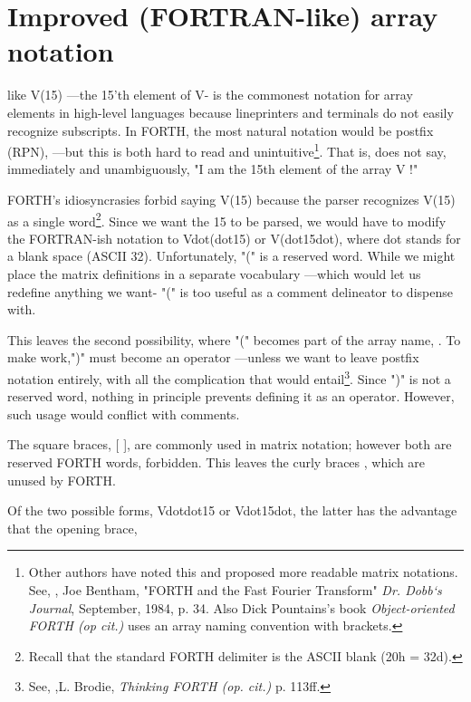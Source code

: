 {\section{Improved (FORTRAN-like) array notation}
 like V(15) —the 15'th element of V- is the commonest notation for array elements in high-level languages because lineprinters and terminals do not easily recognize subscripts. In FORTH, the most natural notation would be postfix (RPN),  —but this is both hard to read and unintuitive\footnote{Other authors have noted this and proposed more readable matrix notations. See, \eg, Joe Bentham, "FORTH and the Fast Fourier Transform" \textit{Dr. Dobb‘s Journal}, September, 1984, p. 34. Also Dick Pountains's book \textit{Object-oriented FORTH (op cit.)} uses an array naming convention with brackets.}. That is,  does not say, immediately and unambiguously, "I am the 15th element of the array V !"

FORTH's idiosyncrasies forbid saying V(15) because the parser recognizes V(15) as a single word\footnote{Recall that the standard FORTH delimiter is the ASCII blank (20h = 32d).}. Since we want the 15 to be parsed, we would have to modify the FORTRAN-ish notation to Vdot(dot15) or V(dot15dot), where dot stands for a blank space (ASCII 32). Unfortunately, "(" is a reserved word. While we might place the matrix definitions in a separate vocabulary —which would let us redefine anything we want- "(" is too useful as a comment delineator to dispense with.

This leaves the second possibility, where "(" becomes part of the array name, . To make  work,")" must become an operator —unless we want to leave postfix notation entirely, with all the complication that would entail\footnote{See, \eg,L. Brodie, \textit{Thinking FORTH (op. cit.)} p. 113ff.}. Since ")" is not a reserved word, nothing in principle prevents defining it as an operator. However, such usage would conflict with comments.

The square braces, [ ], are commonly used in matrix notation; however both are reserved FORTH words, \ie forbidden. This leaves the curly braces { }, which are unused by FORTH.

Of the two possible forms, Vdot{dot15} or V{dot15dot}, the latter has the advantage that the opening brace, }
